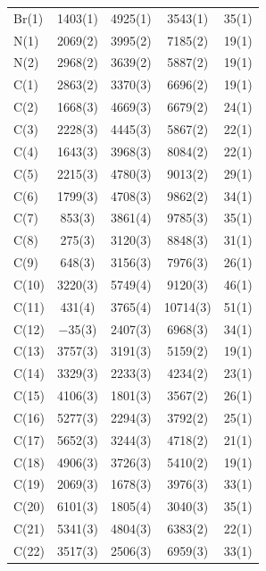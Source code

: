 \twocolumn
\begin{center}
\tablelasttail{\bottomrule} 
 {\footnotesize \singlespacing
\begin{supertabular}{lcccc}
Br(1)&1403(1)&4925(1)&3543(1)&35(1)\\
N(1)&2069(2)&3995(2)&7185(2)&19(1)\\
N(2)&2968(2)&3639(2)&5887(2)&19(1)\\
C(1)&2863(2)&3370(3)&6696(2)&19(1)\\
C(2)&1668(3)&4669(3)&6679(2)&24(1)\\
C(3)&2228(3)&4445(3)&5867(2)&22(1)\\
C(4)&1643(3)&3968(3)&8084(2)&22(1)\\
C(5)&2215(3)&4780(3)&9013(2)&29(1)\\
C(6)&1799(3)&4708(3)&9862(2)&34(1)\\
C(7)&853(3)&3861(4)&9785(3)&35(1)\\
C(8)&275(3)&3120(3)&8848(3)&31(1)\\
C(9)&648(3)&3156(3)&7976(3)&26(1)\\
C(10)&3220(3)&5749(4)&9120(3)&46(1)\\
C(11)&431(4)&3765(4)&10714(3)&51(1)\\
C(12)&$-$35(3)&2407(3)&6968(3)&34(1)\\
C(13)&3757(3)&3191(3)&5159(2)&19(1)\\
C(14)&3329(3)&2233(3)&4234(2)&23(1)\\
C(15)&4106(3)&1801(3)&3567(2)&26(1)\\
C(16)&5277(3)&2294(3)&3792(2)&25(1)\\
C(17)&5652(3)&3244(3)&4718(2)&21(1)\\
C(18)&4906(3)&3726(3)&5410(2)&19(1)\\
C(19)&2069(3)&1678(3)&3976(3)&33(1)\\
C(20)&6101(3)&1805(4)&3040(3)&35(1)\\
C(21)&5341(3)&4804(3)&6383(2)&22(1)\\
C(22)&3517(3)&2506(3)&6959(3)&33(1)\\

\end{supertabular}}
\end{center}
